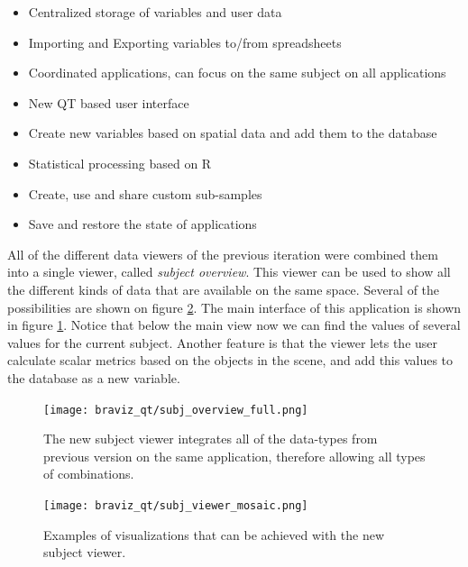 \begin{itemize}
	\item Centralized storage of variables and user data
	\item Importing and Exporting variables to/from spreadsheets
	\item Coordinated applications, can focus on the same subject on all applications
	\item New QT based user interface
	\item Create new variables based on spatial data and add them to the database
	\item Statistical processing based on R
	\item Create, use and share custom sub-samples
	\item Save and restore the state of applications
\end{itemize}

All of the different data viewers of the previous iteration were combined them into a single viewer, called \emph{subject overview}. This viewer can be used to show all the different kinds of data that are available on the same space. Several of the possibilities are shown on figure \ref{fig_subj_viewer_mosaic}. The main interface of this application is shown in figure \ref{fig_subj_overview_2}. Notice that below the main view now we can find the values of several values for the current subject. Another feature is that the viewer lets the user calculate scalar metrics based on the objects in the scene, and add this values to the database as a new variable.

\begin{figure}
\centering
\texttt{[image: braviz\_qt/subj\_overview\_full.png]}
\caption{\label{fig_subj_overview_2}The new subject viewer integrates all of the data-types from previous version on the same application, therefore allowing all types of combinations.}
\end{figure}

\begin{figure}
\centering
\texttt{[image: braviz\_qt/subj\_viewer\_mosaic.png]}
\caption{\label{fig_subj_viewer_mosaic}Examples of visualizations that can be achieved with the new subject viewer.}
\end{figure}

